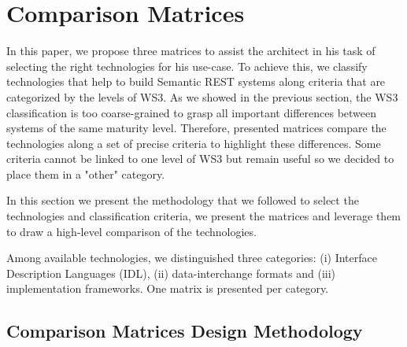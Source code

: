 \section{Comparison Matrices}\label{sec:matrix}

In this paper, we propose three matrices to assist the architect in his task of selecting the right technologies for his use-case. To achieve this, we classify technologies that help to build Semantic REST systems along criteria that are categorized by the levels of WS3. As we showed in the previous section, the WS3 classification is too coarse-grained to grasp all important differences between systems of the same maturity level. Therefore, presented matrices compare the technologies along a set of precise criteria to highlight these differences. Some criteria cannot be linked to one level of WS3 but remain useful so we decided to place them in a "other" category.

In this section we present the methodology that we followed to select the technologies and classification criteria, we present the matrices and leverage them to draw a high-level comparison of the technologies.

Among available technologies, we distinguished three categories: (i) Interface Description Languages (IDL), (ii) data-interchange formats and (iii) implementation frameworks. One matrix is presented per category.

\subsection{Comparison Matrices Design Methodology}





